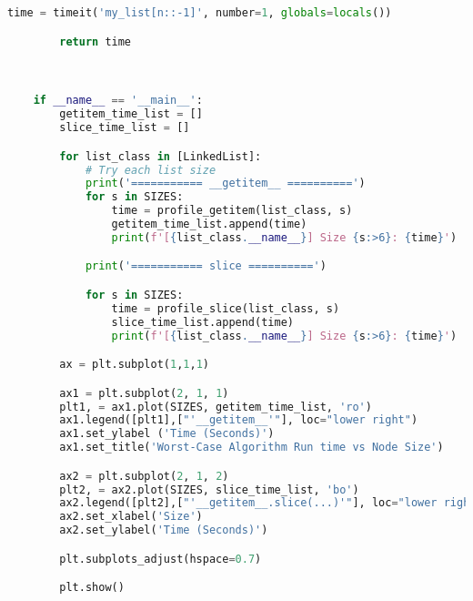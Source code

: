 \documentclass[12pt]{article}
\begin{document}
\begin{mdframed}
\begin{lstlisting}[language=python]
        time = timeit('my_list[n::-1]', number=1, globals=locals())

        return time



    if __name__ == '__main__':
        getitem_time_list = []
        slice_time_list = []

        for list_class in [LinkedList]:
            # Try each list size
            print('=========== __getitem__ ==========')
            for s in SIZES:
                time = profile_getitem(list_class, s)
                getitem_time_list.append(time)
                print(f'[{list_class.__name__}] Size {s:>6}: {time}')

            print('=========== slice ==========')

            for s in SIZES:
                time = profile_slice(list_class, s)
                slice_time_list.append(time)
                print(f'[{list_class.__name__}] Size {s:>6}: {time}')

        ax = plt.subplot(1,1,1)

        ax1 = plt.subplot(2, 1, 1)
        plt1, = ax1.plot(SIZES, getitem_time_list, 'ro')
        ax1.legend([plt1],["'__getitem__'"], loc="lower right")
        ax1.set_ylabel ('Time (Seconds)')
        ax1.set_title('Worst-Case Algorithm Run time vs Node Size')

        ax2 = plt.subplot(2, 1, 2)
        plt2, = ax2.plot(SIZES, slice_time_list, 'bo')
        ax2.legend([plt2],["'__getitem__.slice(...)'"], loc="lower right")
        ax2.set_xlabel('Size')
        ax2.set_ylabel('Time (Seconds)')

        plt.subplots_adjust(hspace=0.7)

        plt.show()
    \end{lstlisting}
\end{mdframed}
\end{document}
